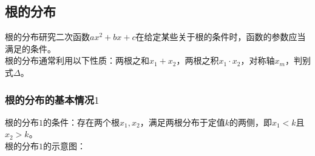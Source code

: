 \documentclass[UTF8]{ctexart}
\begin{document}
\newpage

\subsection{根的分布}
    根的分布研究二次函数$ax^2+bx+c$在给定某些关于根的条件时，函数的参数应当满足的条件。\\[3mm]
    根的分布通常利用以下性质：两根之和$x_1+x_2$，两根之积$x_1\cdot x_2$，对称轴$x_m$，判别式$\Delta$。

\subsubsection{根的分布的基本情况$1$}
    根的分布$1$的条件：存在两个根$x_1,x_2$，满足两根分布于定值$k$的两侧，即$x_1<k$且$x_2>k$。\\[3mm]
    根的分布$1$的示意图：
\end{document}
